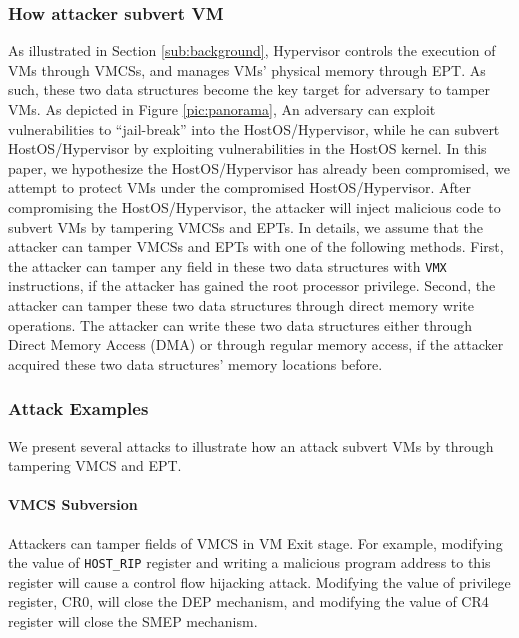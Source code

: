 \subsubsection{How attacker subvert VM}
As illustrated in Section \ref{sub:background}, Hypervisor controls the execution of VMs through VMCSs, and manages VMs' physical memory through EPT. As such, these two data structures become the key target for adversary to tamper VMs. 
As depicted in Figure \ref{pic:panorama}, 
An adversary can exploit vulnerabilities to ``jail-break'' into the HostOS/Hypervisor, while he can subvert HostOS/Hypervisor by exploiting vulnerabilities in the HostOS kernel.
In this paper, we hypothesize the HostOS/Hypervisor has already been compromised, we attempt to protect VMs under the compromised HostOS/Hypervisor. 
After compromising the HostOS/Hypervisor, the attacker will inject malicious code to subvert VMs by tampering VMCSs and EPTs.
In details, we assume that the attacker can tamper VMCSs and EPTs with one of the following methods. First, the attacker can tamper any field in these two data structures with \verb|VMX| instructions, if the attacker has gained the root processor privilege. Second, the attacker can tamper these two data structures through direct memory write operations. The attacker can write these two data structures either through Direct Memory Access (DMA) or through regular memory access, if the attacker acquired these two data structures' memory locations before.  


\subsubsection{Attack Examples}
We present several attacks to illustrate how an attack subvert VMs by through tampering VMCS and EPT.

\paragraph{VMCS Subversion}
Attackers can tamper fields of VMCS in VM Exit stage. For example, modifying the value of \verb|HOST_RIP| register and writing a malicious program address to this register will cause a control flow hijacking attack. Modifying the value of privilege register, CR0, will close the DEP mechanism, and modifying the value of CR4 register will close the SMEP mechanism.


